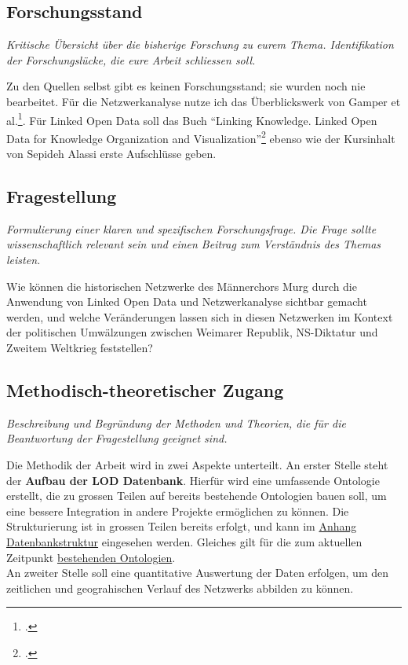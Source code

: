 \documentclass[12pt, a4paper, ngerman, bidi=default]{article}
\begin{document}
\begin{spacing}{1.5}
\subsection{\textbf{Forschungsstand}} 
\textit{Kritische Übersicht über die bisherige Forschung zu eurem Thema.
Identifikation der Forschungslücke, die eure Arbeit schliessen soll.}

Zu den Quellen selbst gibt es keinen Forschungsstand; sie wurden noch nie bearbeitet.
Für die Netzwerkanalyse nutze ich das Überblickswerk von Gamper et al.\footcite{gamper_knoten_2015}.
Für Linked Open Data soll das Buch \enquote{Linking Knowledge. Linked Open Data for Knowledge Organization and Visualization}\footcite{richard_linking_2022}
ebenso wie der Kursinhalt von Sepideh Alassi erste Aufschlüsse geben.

\subsection{\textbf{Fragestellung}}
\textit{Formulierung einer klaren und spezifischen Forschungsfrage.
Die Frage sollte wissenschaftlich relevant sein und einen Beitrag zum Verständnis des Themas leisten.}

 Wie können die historischen Netzwerke des Männerchors Murg durch die Anwendung von Linked Open Data und Netzwerkanalyse sichtbar gemacht werden, und welche Veränderungen lassen sich in diesen Netzwerken im Kontext der politischen Umwälzungen zwischen Weimarer Republik, NS-Diktatur und Zweitem Weltkrieg feststellen?

\subsection{\textbf{Methodisch-theoretischer Zugang}}
\textit{Beschreibung und Begründung der Methoden und Theorien, die für die Beantwortung der Fragestellung geeignet sind.}

 Die Methodik der Arbeit wird in zwei Aspekte unterteilt. An erster Stelle steht der \textbf{Aufbau der LOD Datenbank}. Hierfür wird eine umfassende Ontologie erstellt, die zu grossen Teilen auf bereits bestehende Ontologien bauen soll, um eine bessere Integration in andere Projekte ermöglichen zu können. Die Strukturierung ist in grossen Teilen bereits erfolgt, und kann im  \hyperref[sec:Anhang Datenbankstruktur]{Anhang Datenbankstruktur} eingesehen werden. Gleiches gilt für die zum aktuellen Zeitpunkt \hyperref[tab:bestehenden Ontologien]{bestehenden Ontologien}.\\
An zweiter Stelle soll eine quantitative Auswertung der Daten erfolgen, um den zeitlichen und geograhischen Verlauf des Netzwerks abbilden zu können.  


\end{spacing}
\end{document}
